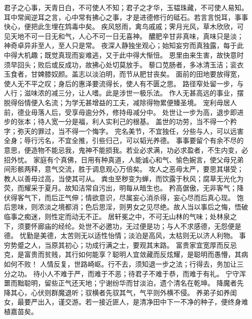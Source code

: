\documentclass[12pt,UTF8]{ctexbook}
\begin{document}
君子之心事，天青日白，不可使人不知；君子之才华，玉韫珠藏，不可使人易知。
耳中常闻逆耳之言，心中常有拂心之事，才是进德修行的砥石。若言言悦耳，事事快心，便把此生埋在鸩毒中矣。
疾风怒雨，禽鸟戚戚；霁月光风，草木欣欣，可见天地不可一日无和气，人心不可一日无喜神。
醲肥辛甘非真味，真味只是淡；神奇卓异非至人，至人只是常。
夜深人静独坐观心；始知妄穷而真独露，每于此中得大机趣；既觉真现而妄难逃，又于此中得大惭忸。
恩里由来生害，故快意时须早回头；败后或反成功，故拂心处切莫放手。
藜口苋肠者，多冰清玉洁；衮衣玉食者，甘婢膝奴颜。盖志以淡泊明，而节从肥甘丧矣。
面前的田地要放得宽，使人无不平之叹；身后的惠泽要流得长，使人有不匮之思。
路径窄处留一步，与人行；滋味浓的减三分，让人嗜。此是涉世一极乐法。
作人无甚高远的事业，摆脱得俗情便入名流；为学无甚增益的工夫，减除得物累便臻圣境。
宠利毋居人前，德业毋落人后，受享毋逾分外，修持毋减分中。
处世让一步为高，退步即进步的张本；待人宽一分是福，利人实利己的根基。
盖世的功劳，当不得一个矜字；弥天的罪过，当不得一个悔字。
完名美节，不宜独任，分些与人，可以远害全身；辱行污名，不宜全推，引些归己，可以韬光养德。
事事要留个有余不尽的意思，便造物不能忌我，鬼神不能损我。若业必求满，功必求盈者，不生内变，必招外忧。
家庭有个真佛，日用有种真道，人能诚心和气、愉色婉言，使父母兄弟间形骸两释，意气交流，胜于调息观心万倍矣。
攻人之恶毋太严，要思其堪受；教人以善毋过高，当使其可从。
粪虫至秽变为蝉，而饮露于秋风；腐草无光化为荧，而耀采于夏月。故知洁常自污出，明每从暗生也。
矜高倨傲，无非客气；降伏得客气下，而后正气伸；情欲意识，尽属妄心消杀得，妄心尽而后真心现。
饱后思味，则浓淡之境都消；色后思淫，则男女之见尽绝。故人当以事后之悔，悟破临事之痴迷，则性定而动无不正。
居轩冕之中，不可无山林的气味；处林泉之下，须要怀廊庙的经纶。处世不必邀功，无过便是功；与人不求感德，无怨便是德。
忧勤是美德，太苦则无以适性怡情；淡泊是高风，太枯则无以济人利物。
事穷势蹙之人，当原其初心；功成行满之士，要观其末路。
富贵家宜宽厚而反忌克，是富贵而贫贱，其行如何能享？聪明人宜敛藏而反炫耀，是聪明而愚懵，其病如何不败！
人情反复，世路崎岖。行不去，须知退一步之法；行得去，务加让三分之功。
待小人不难于严，而难于不恶；待君子不难于恭，而难于有礼。
宁守浑噩而黜聪明，留些正气还天地；宁谢纷华而甘淡泊，遗个清名在乾坤。
降魔者先降其心，心伏则群魔退听；驭横者先驭其气，气平则外横不侵。
养弟子如养闺女，最要严出入，谨交游。若一接近匪人，是清净田中下一不净的种子，便终身难植嘉苗矣。
\end{document}
